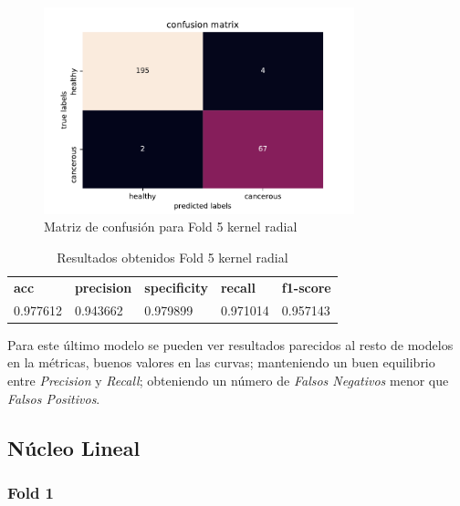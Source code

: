 \begin{figure}[H]
	\centering
	\includegraphics[width=90mm]{imagenes/confusion_mat5_gpflow}
	\caption{Matriz de confusión para Fold 5 kernel radial}
	\label{fig:conf5}
\end{figure}

\begin{table}[H]
	\centering
	\begin{tabular}{lllll}
		\textbf{acc} & \textbf{precision} & \textbf{specificity} & \textbf{recall} & \textbf{f1-score} \\
		0.977612     & 0.943662           & 0.979899             & 0.971014        & 0.957143        
	\end{tabular}
	\caption{Resultados obtenidos Fold 5 kernel radial}
	\label{table:5}
\end{table}

Para este último modelo se pueden ver resultados parecidos al resto de modelos en la métricas, buenos valores en las curvas; manteniendo un buen equilibrio entre \textit{Precision} y \textit{Recall}; obteniendo un número de \textit{Falsos Negativos} menor que \textit{Falsos Positivos}.

\subsection{Núcleo Lineal}
\subsubsection{Fold 1}

